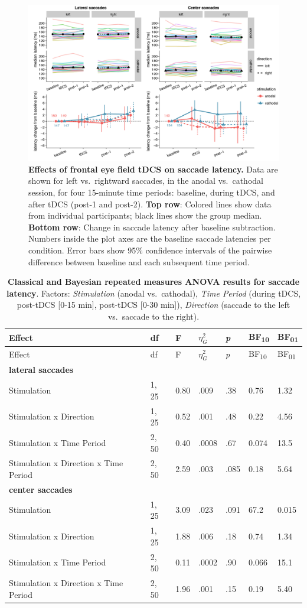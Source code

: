 \documentclass[11pt,]{memoir}
\begin{document}
\begin{figure}
\includegraphics[width=130mm]{sacc_tDCS_files/figures/figure_4_latency} \caption{\textbf{Effects of frontal eye field tDCS on saccade latency.} Data are shown for left vs.~rightward saccades, in the anodal vs.~cathodal session, for four 15-minute time periods: baseline, during tDCS, and after tDCS (post-1 and post-2). \textbf{Top row}: Colored lines show data from individual participants; black lines show the group median. \textbf{Bottom row}: Change in saccade latency after baseline subtraction. Numbers inside the plot axes are the baseline saccade latencies per condition. Error bars show 95\% confidence intervals of the pairwise difference between baseline and each subsequent time period.}\label{fig:fig-latency}
\end{figure}



\begingroup
\setlength{\LTleft}{-20cm plus -1fill}
\setlength{\LTright}{\LTleft}
\small

\begin{longtable}[]{@{}lllllll@{}}
\caption{\label{tab:tab-latency} \textbf{Classical and Bayesian repeated measures ANOVA results for saccade latency}. Factors: \emph{Stimulation} (anodal vs.~cathodal), \emph{Time Period} (during tDCS, post-tDCS {[}0-15 min{]}, post-tDCS {[}0-30 min{]}), \emph{Direction} (saccade to the left vs.~saccade to the right).}\tabularnewline
\toprule
Effect & df & F & \(\eta_{G}^{2}\) & \emph{p} & BF\textsubscript{10} & BF\textsubscript{01}\tabularnewline
\midrule
\endfirsthead
\toprule
Effect & df & F & \(\eta_{G}^{2}\) & \emph{p} & BF\textsubscript{10} & BF\textsubscript{01}\tabularnewline
\midrule
\endhead
\textbf{lateral saccades} & & & & & &\tabularnewline
Stimulation & 1, 25 & 0.80 & .009 & .38 & 0.76 & 1.32\tabularnewline
Stimulation x Direction & 1, 25 & 0.52 & .001 & .48 & 0.22 & 4.56\tabularnewline
Stimulation x Time Period & 2, 50 & 0.40 & .0008 & .67 & 0.074 & 13.5\tabularnewline
Stimulation x Direction x Time Period & 2, 50 & 2.59 & .003 & .085 & 0.18 & 5.64\tabularnewline
\textbf{center saccades} & & & & & &\tabularnewline
Stimulation & 1, 25 & 3.09 & .023 & .091 & 67.2 & 0.015\tabularnewline
Stimulation x Direction & 1, 25 & 1.88 & .006 & .18 & 0.74 & 1.34\tabularnewline
Stimulation x Time Period & 2, 50 & 0.11 & .0002 & .90 & 0.066 & 15.1\tabularnewline
Stimulation x Direction x Time Period & 2, 50 & 1.96 & .001 & .15 & 0.19 & 5.40\tabularnewline
\bottomrule
\end{longtable}
\end{document}

